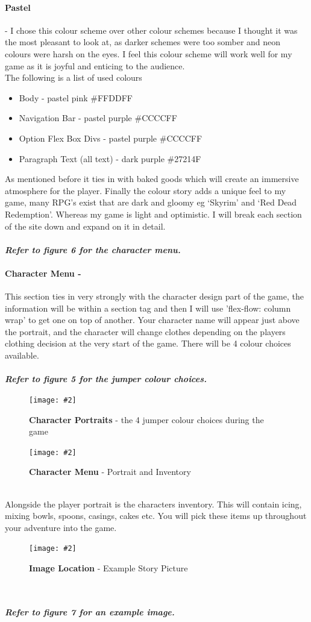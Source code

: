 \documentclass[10pt, a4paper]{article}
\newcommand{\figuremacro}[5]{
    \begin{figure}[#1]
        \centering
        \texttt{[image: \#2]}
        \caption[#3]{\textbf{#3}#4}
        \label{fig:#2}
    \end{figure}
}
\begin{document}
    \paragraph{Pastel} - I chose this colour scheme over other colour schemes because I thought it was the most pleasant to look at, as darker schemes were too somber and neon colours were harsh on the eyes. I feel this colour scheme will work well for my game as it is joyful and enticing to the audience. \\
    The following is a list of used colours
    \begin{itemize}
		\item Body - pastel pink \#FFDDFF
		\item Navigation Bar - pastel purple \#CCCCFF
		\item Option Flex Box Divs - pastel purple \#CCCCFF
		\item Paragraph Text (all text) - dark purple \#27214F
	\end{itemize}
    As mentioned before it ties in with baked goods which will create an immersive atmosphere for the player. Finally the colour story adds a unique feel to my game, many RPG’s exist that are dark and gloomy eg ‘Skyrim’ and ‘Red Dead Redemption’. Whereas my game is light and optimistic.
    I will break each section of the site down and expand on it in detail. \\ 
    \\
    \textbf{\textit{Refer to figure 6 for the character menu.}} \\
    \paragraph{Character Menu - } This section ties in very strongly with the character design part of the game, the information will be within a section tag and then I will use 'flex-flow: column wrap' to get one on top of another. Your character name will appear just above the portrait, and the character will change clothes depending on the players clothing decision at the very start of the game. There will be 4 colour choices available. \\
    \\
    \textbf{\textit{Refer to figure 5 for the jumper colour choices.}} \\
    \figuremacro{h}{portraits}{Character Portraits}{ - the 4 jumper colour choices during the game}{1.0}
    \figuremacro{h}{interface-sidebar}{Character Menu}{ - Portrait and Inventory}{0.25} \\
    Alongside the player portrait is the characters inventory. This will contain icing, mixing bowls, spoons, casings, cakes etc. You will pick these items up throughout your adventure into the game.
    \figuremacro{h}{interface-image}{Image Location}{ - Example Story Picture}{1.0} \\
    \\
    \textbf{\textit{Refer to figure 7 for an example image.}}
\end{document}
